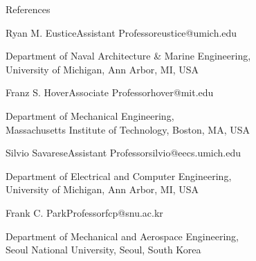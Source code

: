 \begin{rSection}{References}

\begin{rSubsection}{Ryan M. Eustice}{}{Assistant Professor}{eustice@umich.edu}
\item Department of Naval Architecture \& Marine Engineering, \\University of Michigan, Ann Arbor, MI, USA
\end{rSubsection}

\begin{rSubsection}{Franz S. Hover}{}{Associate Professor}{hover@mit.edu}
\item Department of Mechanical Engineering, \\Massachusetts Institute of Technology, Boston, MA, USA
\end{rSubsection}

\begin{rSubsection}{Silvio Savarese}{}{Assistant Professor}{silvio@eecs.umich.edu}
\item Department of Electrical and Computer Engineering, \\University of Michigan, Ann Arbor, MI, USA
\end{rSubsection}

\begin{rSubsection}{Frank C. Park}{}{Professor}{fcp@snu.ac.kr}
\item Department of Mechanical and Aerospace Engineering, \\Seoul National University, Seoul, South Korea
\end{rSubsection}

\end{rSection}

